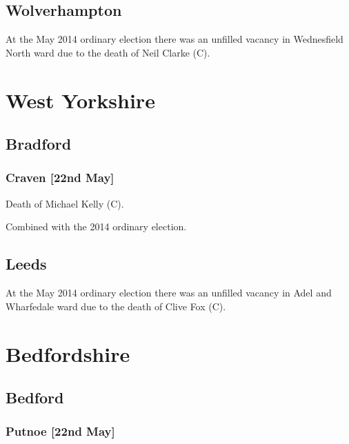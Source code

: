 \begin{resultsiii}
\subsection*{Wolverhampton}

At the May 2014 ordinary election there was an unfilled vacancy in Wednesfield North ward due to the death of Neil Clarke (C).

\section{West Yorkshire}

\subsection*{Bradford}

\subsubsection*{Craven \hspace*{\fill}\nolinebreak[1]%
\enspace\hspace*{\fill}
[22nd May]}


Death of Michael Kelly (C).

Combined with the 2014 ordinary election.

\subsection*{Leeds}

At the May 2014 ordinary election there was an unfilled vacancy in Adel and Wharfedale ward due to the death of Clive Fox (C).

\section{Bedfordshire}

\subsection*{Bedford}

\subsubsection*{Putnoe \hspace*{\fill}\nolinebreak[1]%
\enspace\hspace*{\fill}
[22nd May]}


\end{resultsiii}
